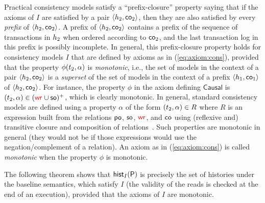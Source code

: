 Practical consistency models satisfy a ``prefix-closure'' property saying that if the axioms of $I$ are satisfied by a pair $\tup{\hist_2,\co_2}$, then they are also satisfied by every \emph{prefix} of $\tup{\hist_2,\co_2}$. A prefix of $\tup{\hist_2,\co_2}$ contains a prefix of the sequence of transactions in $\hist_2$ when ordered according to $\co_2$, and the last transaction log in this prefix is possibly incomplete.
In general, this prefix-closure property holds for consistency models $I$ that are defined by axioms as in (\ref{eq:axiom:cons}), provided that the property $\phi(\tr_2,\alpha)$ is \emph{monotonic}, i.e., the set of models in the context of a pair $\tup{\hist_2,\co_2}$ is a \emph{superset} of the set of models in the context of a prefix $ \tup{\hist_1,\co_1}$ of $\tup{\hist_2,\co_2}$. For instance, the property $\phi$ in the axiom defining $\mathsf{Causal}$ is $(\tr_2,\alpha)\in (\wro \cup \so)^+$, which is clearly monotonic. In general, standard consistency models are defined using a property $\alpha$ of the form $(\tr_2,\alpha)\in R$ where $R$ is an expression built from the relations $\po$, $\so$, $\wro$, and $\co$ using (reflexive and) transitive closure and composition of relations~\cite{DBLP:journals/pacmpl/BiswasE19}. Such properties are monotonic in general (they would not be if those expressions would use the negation/complement of a relation).  An axiom as in (\ref{eq:axiom:cons}) is called \emph{monotonic} when the property $\phi$ is monotonic. 

The following theorem shows that $\histOf[I]{\prog}$ is precisely the set of histories under the baseline semantics, which satisfy $I$ (the validity of the reads is checked at the end of an execution), provided that the axioms of $I$ are monotonic.

